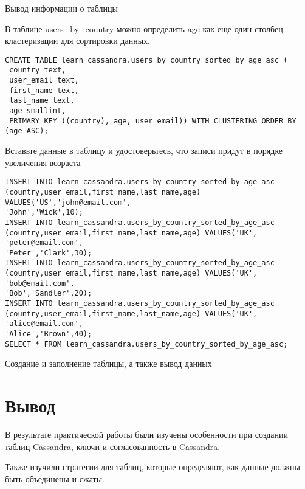 \begin{image}
	\caption{Вывод информации о таблицы}
	\label{fig:info}
\end{image}

В таблице users\_by\_country можно определить age как еще один столбец
кластеризации для сортировки данных.

\begin{verbatim}
CREATE TABLE learn_cassandra.users_by_country_sorted_by_age_asc (
 country text,
 user_email text,
 first_name text,
 last_name text,
 age smallint,
 PRIMARY KEY ((country), age, user_email)) WITH CLUSTERING ORDER BY (age ASC);
\end{verbatim}

Вставьте данные в таблицу и удостоверьтесь, что записи придут в порядке
увеличения возраста

\begin{verbatim}
INSERT INTO learn_cassandra.users_by_country_sorted_by_age_asc
(country,user_email,first_name,last_name,age) VALUES('US','john@email.com',
'John','Wick',10);
INSERT INTO learn_cassandra.users_by_country_sorted_by_age_asc
(country,user_email,first_name,last_name,age) VALUES('UK', 'peter@email.com',
'Peter','Clark',30);
INSERT INTO learn_cassandra.users_by_country_sorted_by_age_asc
(country,user_email,first_name,last_name,age) VALUES('UK', 'bob@email.com',
'Bob','Sandler',20);
INSERT INTO learn_cassandra.users_by_country_sorted_by_age_asc
(country,user_email,first_name,last_name,age) VALUES('UK', 'alice@email.com',
'Alice','Brown',40);
SELECT * FROM learn_cassandra.users_by_country_sorted_by_age_asc;
\end{verbatim}

\begin{image}
	\caption{Создание и заполнение таблицы, а также вывод данных}
	\label{fig:filter:key}
\end{image}

\section*{\LARGE Вывод}
В результате практической работы были изучены
особенности при создании таблиц Cassandra,
ключи и согласованность в Cassandra.\par
Также изучили стратегии для таблиц, которые определяют,
как данные должны быть объединены и сжаты.

